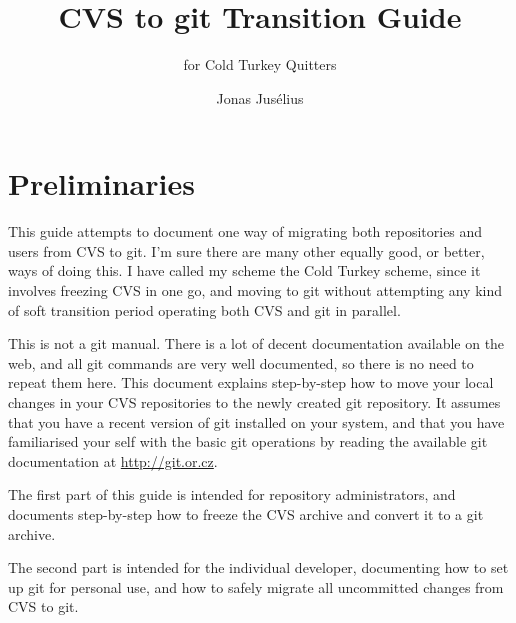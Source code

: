 \documentclass[a4paper,10pt]{article}
\begin{document}
\pagestyle{fancy}
\fancyfoot{}
\fancyhead{}
\renewcommand{\sectionmark}[1]{\markboth{\sf\thesection.\ #1}{}}
\renewcommand{\subsectionmark}[1]{}
\fancyhead[R]{{\rmfamily\thepage}}

\title{CVS to git Transition Guide}

\subtitle{for Cold Turkey Quitters}
\author{{\sf Jonas Jus\'elius}}
\address{
{\tt <jonas.juselius@chem.uit.no>}\\
{\sf University of Tromsø}\\
{\sf Department of Chemistry}\\
{\sf N-9037 University of Tromsø, Norway}
}

\maketitle
\tableofcontents
\newpage

\section{Preliminaries}
This guide attempts to document one way of migrating both repositories and 
users from  CVS to git. 
I'm sure there are many other equally good, or better, ways of doing 
this. I have called my scheme the Cold Turkey scheme, since it involves
freezing CVS in one go, and moving to git without attempting any kind of soft
transition period operating both CVS and git in parallel. 

This is not a git manual. There is a lot of decent
documentation available on the web, and all git commands are very well
documented, so there is no need to repeat them here. 
This document explains step-by-step how to move your local changes
in your CVS repositories to the newly created git repository. It assumes that
you have a recent version of git installed on your system, and that you have
familiarised your self with the basic git operations by reading the available
git documentation at \url{http://git.or.cz}. 

The first part of this guide is intended for repository administrators, and
documents step-by-step how to freeze the CVS archive and convert it to a git
archive. 

The second part is intended for the individual developer, documenting how to
set up git for personal use, and how to safely migrate all uncommitted changes
from CVS to git.
\end{document}
